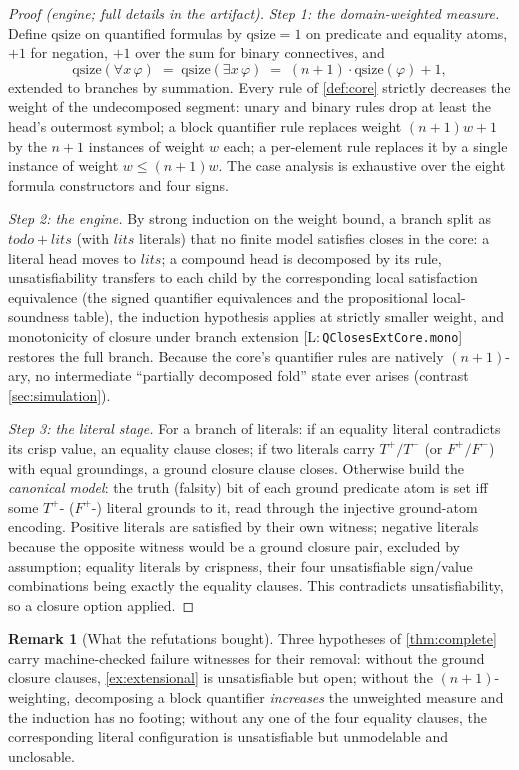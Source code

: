 \documentclass[11pt,a4paper]{article}
\theoremstyle{definition}
\newtheorem{remark}[theorem]{Remark}
\newcommand{\Tp}{T^{+}}\newcommand{\Tm}{T^{-}}
\newcommand{\Fp}{F^{+}}\newcommand{\Fm}{F^{-}}
\newcommand{\lean}[1]{\texttt{#1}}
\newcommand{\qsize}{\mathrm{qsize}}
\begin{document}
\begin{proof}[Proof (engine; full details in the artifact)]
\emph{Step 1: the domain-weighted measure.} Define $\qsize$ on quantified
formulas by $\qsize=1$ on predicate and equality atoms, $+1$ for negation,
$+1$ over the sum for binary connectives, and
\[
\qsize(\forall x\,\varphi) \;=\; \qsize(\exists x\,\varphi) \;=\;
(n{+}1)\cdot\qsize(\varphi)+1 ,
\]
extended to branches by summation. Every rule of \cref{def:core} strictly
decreases the weight of the undecomposed segment: unary and binary rules
drop at least the head's outermost symbol; a block quantifier rule
replaces weight $(n{+}1)w+1$ by the $n{+}1$ instances of weight $w$ each;
a per-element rule replaces it by a single instance of weight
$w\le (n{+}1)w$. The case analysis is exhaustive over the eight formula
constructors and four signs.

\emph{Step 2: the engine.} By strong induction on the weight bound, a
branch split as $\mathit{todo} + \mathit{lits}$ (with $\mathit{lits}$
literals) that no finite model satisfies closes in the core: a literal
head moves to $\mathit{lits}$; a compound head is decomposed by its rule,
unsatisfiability transfers to each child by the corresponding local
satisfaction equivalence (the signed quantifier equivalences and the
propositional local-soundness table), the induction hypothesis applies at
strictly smaller weight, and monotonicity of closure under branch
extension [L:\,\lean{QClosesExtCore.mono}] restores the full
branch. Because the core's quantifier rules are natively $(n{+}1)$-ary,
no intermediate ``partially decomposed fold'' state ever arises
(contrast \cref{sec:simulation}).

\emph{Step 3: the literal stage.} For a branch of literals: if an equality
literal contradicts its crisp value, an equality clause closes; if two
literals carry $\Tp/\Tm$ (or $\Fp/\Fm$) with equal groundings, a ground
closure clause closes. Otherwise build the \emph{canonical model}: the
truth (falsity) bit of each ground predicate atom is set iff some $\Tp$-
($\Fp$-) literal grounds to it, read through the injective ground-atom
encoding. Positive literals are satisfied by their own witness; negative
literals because the opposite witness would be a ground closure pair,
excluded by assumption; equality literals by crispness, their four
unsatisfiable sign/value combinations being exactly the equality clauses.
This contradicts unsatisfiability, so a closure option applied.
\end{proof}

\begin{remark}[What the refutations bought]\label{rem:r5}
Three hypotheses of \cref{thm:complete} carry machine-checked failure
witnesses for their removal: without the ground closure clauses,
\cref{ex:extensional} is unsatisfiable but open; without the
$(n{+}1)$-weighting, decomposing a block quantifier \emph{increases} the
unweighted measure and the induction has no footing; without any one of
the four equality clauses, the corresponding literal configuration is
unsatisfiable but unmodelable and unclosable.
\end{remark}
\end{document}
